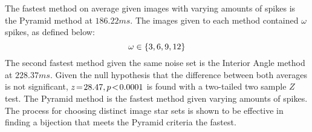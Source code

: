 \documentclass[conference]{IEEEtran}
\begin{document}
    The fastest method on average given images with varying amounts of spikes is the Pyramid method at $186.22\si{ms}$.
    The images given to each method contained $\omega$ spikes, as defined below:
    \begin{equation}\label{eq:numberOfSpikes}
    \omega \in \set{ 3, 6, 9, 12 }
    \end{equation}
    The second fastest method given the same noise set is the Interior Angle method at $228.37\si{ms}$.
    Given the null hypothesis that the difference between both averages is not significant, $z \!=\! 28.47, p\!<\!0.0001$ is
    found with a two-tailed two sample $Z$ test.
    The Pyramid method is the fastest method given varying amounts of spikes.
    The process for choosing distinct image star sets is shown to be effective in finding a bijection that meets the Pyramid
    criteria the fastest.
\end{document}
